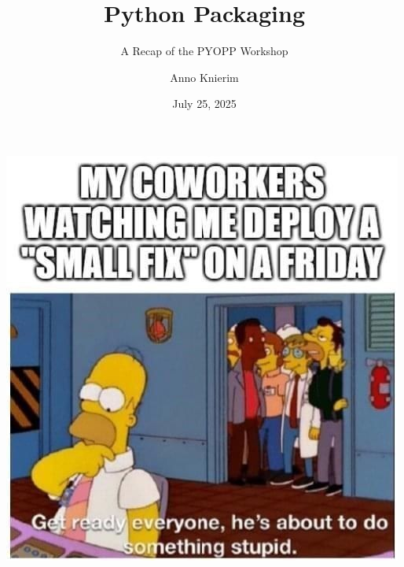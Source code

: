 \documentclass[aspectratio=1610, 9pt]{beamer}
\title{Python Packaging}
\subtitle{A Recap of the PYOPP Workshop}
\author[A.~Knierim]{Anno Knierim}
\date{July 25, 2025}
\begin{document}
\maketitle









\begin{frame}
  \begin{center}
    \includegraphics[height=0.75\textheight]{graphics/homer.jpg}
  \end{center}
\end{frame}
\end{document}
